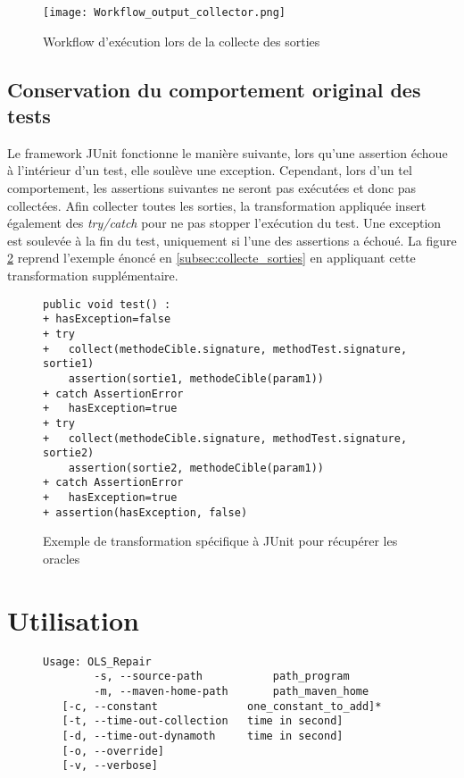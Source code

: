 \begin{figure}[H]
\begin{center}
\texttt{[image: Workflow\_output\_collector.png]}
\end{center}
\caption{Workflow d'exécution lors de la collecte des sorties}
\label{fig:workflow_collectes_sorties}
\end{figure}

\subsection{Conservation du comportement original des tests}

\par Le framework JUnit fonctionne le manière suivante, lors qu'une assertion échoue à l'intérieur d'un test, elle soulève une exception. Cependant, lors d'un tel comportement, les assertions suivantes ne seront pas exécutées et donc pas collectées. Afin collecter toutes les sorties, la transformation appliquée insert également des \textit{try/catch} pour ne pas stopper l'exécution du test. Une exception est soulevée à la fin du test, uniquement si l'une des assertions a échoué. La figure \ref{fig:collect_sorties_try_catch} reprend l'exemple énoncé en \ref{subsec:collecte_sorties} en appliquant cette transformation supplémentaire.

\begin{figure}[H]
\begin{lstlisting}
public void test() :
+ hasException=false
+ try
+   collect(methodeCible.signature, methodTest.signature, sortie1)
    assertion(sortie1, methodeCible(param1))
+ catch AssertionError
+   hasException=true
+ try
+   collect(methodeCible.signature, methodTest.signature, sortie2)
    assertion(sortie2, methodeCible(param1))
+ catch AssertionError
+   hasException=true
+ assertion(hasException, false)
\end{lstlisting}
\caption{Exemple de transformation spécifique à JUnit pour récupérer les oracles}
\label{fig:collect_sorties_try_catch}
\end{figure}






\section{Utilisation}

\begin{figure}[H]

\begin{verbatim}
Usage: OLS_Repair
	    -s, --source-path           path_program
	    -m, --maven-home-path       path_maven_home
   [-c, --constant              one_constant_to_add]*
   [-t, --time-out-collection   time in second]
   [-d, --time-out-dynamoth     time in second]
   [-o, --override]
   [-v, --verbose]
\end{verbatim}

\end{figure}
	

	
		
		
		